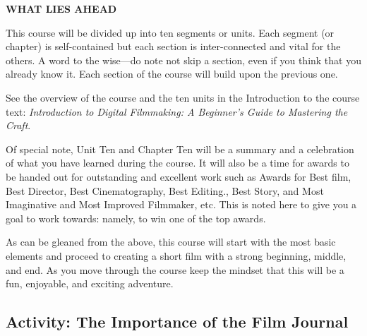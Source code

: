 \documentclass[
]{book}
\begin{document}
\textbf{WHAT LIES AHEAD}

This course will be divided up into ten segments or units. Each segment (or chapter) is self-contained but each section is inter-connected and vital for the others. A word to the wise---do note not skip a section, even if you think that you already know it. Each section of the course will build upon the previous one.

See the overview of the course and the ten units in the Introduction to the course text: \emph{Introduction to Digital Filmmaking: A Beginner's Guide to Mastering the Craft}.

Of special note, Unit Ten and Chapter Ten will be a summary and a celebration of what you have learned during the course. It will also be a time for awards to be handed out for outstanding and excellent work such as Awards for Best film, Best Director, Best Cinematography, Best Editing., Best Story, and Most Imaginative and Most Improved Filmmaker, etc. This is noted here to give you a goal to work towards: namely, to win one of the top awards.

As can be gleaned from the above, this course will start with the most basic elements and proceed to creating a short film with a strong beginning, middle, and end. As you move through the course keep the mindset that this will be a fun, enjoyable, and exciting adventure.

\hypertarget{activity-the-importance-of-the-film-journal}{%
\subsection*{Activity: The Importance of the Film Journal}\label{activity-the-importance-of-the-film-journal}}
\end{document}
